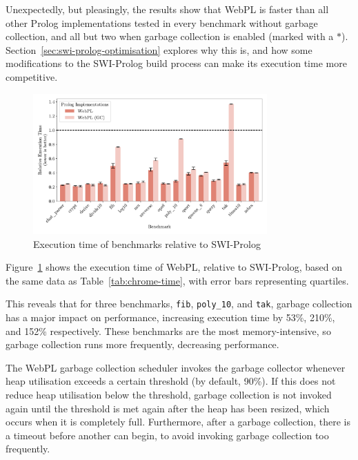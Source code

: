 \vspace*{-1.5em}

Unexpectedly, but pleasingly, the results show that WebPL is faster than all other Prolog implementations tested in every benchmark without garbage collection, and all but two when garbage collection is enabled (marked with a $\ast$). Section~\ref{sec:swi-prolog-optimisation} explores why this is, and how some modifications to the SWI-Prolog build process can make its execution time more competitive.

\begin{figure}[H]
\centering
\includegraphics[width=0.8\textwidth]{relative_performance.pdf}
\caption{Execution time of benchmarks relative to SWI-Prolog}
\label{fig:relative-performance}
\end{figure}

Figure~\ref{fig:relative-performance} shows the execution time of WebPL, relative to SWI-Prolog, based on the same data as Table~\ref{tab:chrome-time}, with error bars representing quartiles.

This reveals that for three benchmarks, \texttt{fib}, \texttt{poly\_10}, and \texttt{tak}, garbage collection has a major impact on performance, increasing execution time by 53\%, 210\%, and 152\% respectively. These benchmarks are the most memory-intensive, so garbage collection runs more frequently, decreasing performance.

The WebPL garbage collection scheduler invokes the garbage collector whenever heap utilisation exceeds a certain threshold (by default, 90\%). If this does not reduce heap utilisation below the threshold, garbage collection is not invoked again until the threshold is met again after the heap has been resized, which occurs when it is completely full. Furthermore, after a garbage collection, there is a timeout before another can begin, to avoid invoking garbage collection too frequently.

